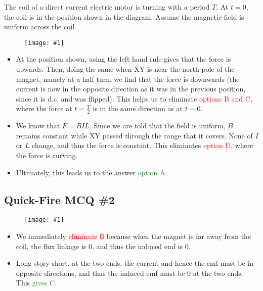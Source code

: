 \documentclass[a4paper,12pt]{article}
\newcommand{\img}[4]{\begin{center}
  \begin{figure}[H]
    \centering
    \texttt{[image: \#1]}
    \caption{#3}
    \label{fig:#4}
  \end{figure}
\end{center}}
\begin{document}
The coil of a direct current electric motor is turning with a period $T$. At $t = 0$, the coil is in the position shown in the diagram. Assume the magnetic field is uniform across the coil.

\img{ex/12.png}{0.75}{}{motor}

\begin{itemize}
  \item At the position shown, using the left hand rule gives that the force is upwards. Then, doing the same when XY is near the north pole of the magnet, namely at a half turn, we find that the force is downwards (the current is now in the opposite direction as it was in the previous position, since it is d.c. and was flipped). This helps us to eliminate \textcolor{red}{options B and C}, where the force at $t=\frac{T}{2}$ is in the same direction as at $t = 0$.
  \item We know that $F = BIL$. Since we are told that the field is uniform, $B$ remains constant while XY passed through the range that it covers. None of $I$ or $L$ change, and thus the force is constant. This eliminates \textcolor{red}{option D}, where the force is curving.
  \item Ultimately, this leads us to the answer \textcolor{ForestGreen}{option A}.
\end{itemize}

\pagebreak

\subsection{Quick-Fire MCQ \#2}

\img{ex/13.png}{0.75}{}{quickfire}
\begin{itemize}
  \item We immediately \textcolor{red}{eliminate B} because when the magnet is far away from the coil, the flux linkage is 0, and thus the induced emf is 0.
  \item Long story short, at the two ends, the current and hence the emf must be in opposite directions, and thus the induced emf must be 0 at the two ends. This \textcolor{ForestGreen}{gives C}.
\end{itemize}
\end{document}
